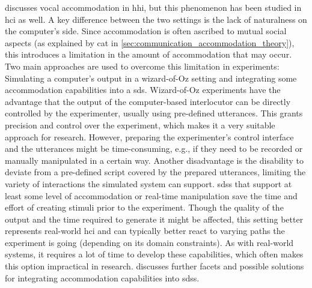  discusses vocal accommodation in \ac{hhi}, but this phenomenon has been studied in \ac{hci} as well.
A key difference between the two settings is the lack of naturalness on the computer's side. 
Since accommodation is often ascribed to mutual social aspects (as explained by \ac{cat} in \cref{sec:communication_accommodation_theory}), this introduces a limitation in the amount of accommodation that may occur.
Two main approaches are used to overcome this limitation in experiments:
Simulating a computer's output in a wizard-of-Oz setting and integrating some accommodation capabilities into a \ac{sds}.
Wizard-of-Oz experiments have the advantage that the output of the computer-based interlocutor can be directly controlled by the experimenter, usually using pre-defined utterances.
This grants precision and control over the experiment, which makes it a very suitable approach for research.
However, preparing the experimenter's control interface and the utterances might be time-consuming, e.g., if they need to be recorded or manually manipulated in a certain way.
Another disadvantage is the disability to deviate from a pre-defined script covered by the prepared utterances, limiting the variety of interactions the simulated system can support.
\Acp{sds} that support at least some level of accommodation or real-time manipulation save the time and effort of creating stimuli prior to the experiment.
Though the quality of the output and the time required to generate it might be affected, this setting better represents real-world \ac{hci} and can typically better react to varying paths the experiment is going (depending on its domain constraints).
As with real-world systems, it requires a lot of time to develop these capabilities, which often makes this option impractical in research.
 discusses further facets and possible solutions for integrating accommodation capabilities into \acp{sds}.


